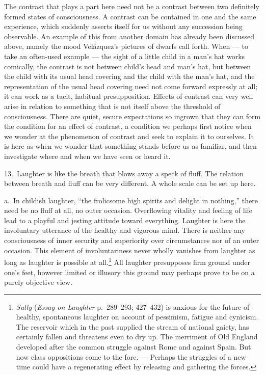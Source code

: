\documentclass[12pt]{book}
\newcommand{\opage}[1]{\marginnote{\footnotesize\textit{[#1]}}}
\begin{document}
The contrast that plays a part here need not be a contrast between two definitely
formed states of consciousness. A contrast can be contained in one and the same
experience, which suddenly asserts itself for us without any succession being
observable. An example of this from another domain has already been discussed
above, namely the mood Velázquez's pictures of dwarfs call forth. When --- to take
an often-used example --- the sight of a little child in a man's hat works
comically, the \opage{51}contrast is not between child's head and man's hat, but
between the child with its usual head covering and the child with the man's hat,
and the representation of the usual head covering need not come forward expressly
at all; it can work as a tacit, habitual presupposition. Effects of contrast can
very well arise in relation to something that is not itself above the threshold of
consciousness. There are quiet, secure expectations so ingrown that they can form
the condition for an effect of contrast, a condition we perhaps first notice when
we wonder at the phenomenon of contrast and seek to explain it to ourselves. It is
here as when we wonder that something stands before us as familiar, and then
investigate where and when we have seen or heard it.

13.~Laughter is like the breath that blows away a speck of fluff. The relation
between breath and fluff can be very different. A whole scale can be set up here.

a.~In childish laughter, ``the frolicsome high spirits and delight in nothing,''
there need be no fluff at all, no outer occasion. Overflowing vitality and feeling
of life lead to a playful and jesting attitude toward everything. Laughter is here
the involuntary utterance of the healthy and vigorous mind. There is neither any
consciousness of inner security and superiority over circumstances nor of an outer
occasion. This element of involuntariness never wholly vanishes from laughter as
long as laughter is possible at all.\footnote{\textit{Sully} (\textit{Essay on
Laughter} p.~289--293; 427--432) is anxious for the future of healthy, spontaneous
laughter on account of pessimism, fatigue and cynicism. The reservoir which in the
past supplied the stream of national gaiety, has certainly fallen and threatens
even to dry up. The merriment of Old England developed after the common struggle
against Rome and against Spain. But now class oppositions come to the fore. ---
Perhaps the struggles of a new time could have a regenerating effect by releasing
and gathering the forces.} All laughter presupposes firm ground under one's feet,
however limited or illusory this ground may perhaps prove to be on a purely
objective view.
\end{document}
